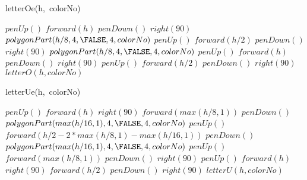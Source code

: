 \documentclass[a4paper,10pt]{article}
\begin{document}
\begin{algorithm}
\caption{letterOe(h,\ colorNo)}
\begin{algorithmic}[5]

\STATE {}
\STATE {}
  \STATE \(penUp()\)
  \STATE \(forward(h)\)
  \STATE \(penDown()\)
  \STATE \(right(90)\)
  \STATE {}
  \STATE {}
  \STATE \(polygonPart(h/8,4,\FALSE,4,colorNo)\)
  \STATE \(penUp()\)
  \STATE \(forward(h/2)\)
  \STATE \(penDown()\)
  \STATE \(right(90)\)
  \STATE {}
  \STATE {}
  \STATE \(polygonPart(h/8,4,\FALSE,4,colorNo)\)
  \STATE \(penUp()\)
  \STATE \(forward(h)\)
  \STATE \(penDown()\)
  \STATE \(right(90)\)
  \STATE \(penUp()\)
  \STATE \(forward(h/2)\)
  \STATE \(penDown()\)
  \STATE \(right(90)\)
  \STATE \(letterO(h,colorNo)\)

\end{algorithmic}
\end{algorithm}


\begin{algorithm}
\caption{letterUe(h,\ colorNo)}
\begin{algorithmic}[5]

\STATE {}
\STATE {}
  \STATE \(penUp()\)
  \STATE \(forward(h)\)
  \STATE \(right(90)\)
  \STATE \(forward(max(h/8,1))\)
  \STATE \(penDown()\)
  \STATE {}
  \STATE {}
  \STATE \(polygonPart(max(h/16,1),4,\FALSE,4,colorNo)\)
  \STATE \(penUp()\)
  \STATE \(forward(h/2-2*max(h/8,1)-max(h/16,1))\)
  \STATE \(penDown()\)
  \STATE {}
  \STATE {}
  \STATE \(polygonPart(max(h/16,1),4,\FALSE,4,colorNo)\)
  \STATE \(penUp()\)
  \STATE \(forward(max(h/8,1))\)
  \STATE \(penDown()\)
  \STATE \(right(90)\)
  \STATE \(penUp()\)
  \STATE \(forward(h)\)
  \STATE \(right(90)\)
  \STATE \(forward(h/2)\)
  \STATE \(penDown()\)
  \STATE \(right(90)\)
  \STATE \(letterU(h,colorNo)\)

\end{algorithmic}
\end{algorithm}
\end{document}
